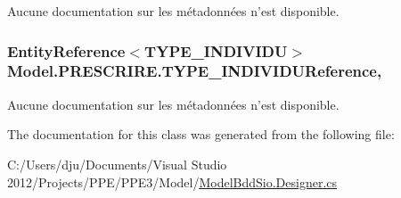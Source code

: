 Aucune documentation sur les métadonnées n'est disponible. 

\hypertarget{class_model_1_1_p_r_e_s_c_r_i_r_e_aa58692d5b4e38e34b13f7df01fdcb321}{
\subsubsection[{T\-Y\-P\-E\-\_\-\-I\-N\-D\-I\-V\-I\-D\-U\-Reference}]{\setlength{\rightskip}{0pt plus 5cm}Entity\-Reference$<${\bf T\-Y\-P\-E\-\_\-\-I\-N\-D\-I\-V\-I\-D\-U}$>$ Model.\-P\-R\-E\-S\-C\-R\-I\-R\-E.\-T\-Y\-P\-E\-\_\-\-I\-N\-D\-I\-V\-I\-D\-U\-Reference\hspace{0.3cm}{\ttfamily [get]}, {\ttfamily [set]}}}\label{class_model_1_1_p_r_e_s_c_r_i_r_e_aa58692d5b4e38e34b13f7df01fdcb321}


Aucune documentation sur les métadonnées n'est disponible. 



The documentation for this class was generated from the following file\-:\begin{DoxyCompactItemize}
\item 
C\-:/\-Users/dju/\-Documents/\-Visual Studio 2012/\-Projects/\-P\-P\-E/\-P\-P\-E3/\-Model/\hyperlink{_model_bdd_sio_8_designer_8cs}{Model\-Bdd\-Sio.\-Designer.\-cs}\end{DoxyCompactItemize}
